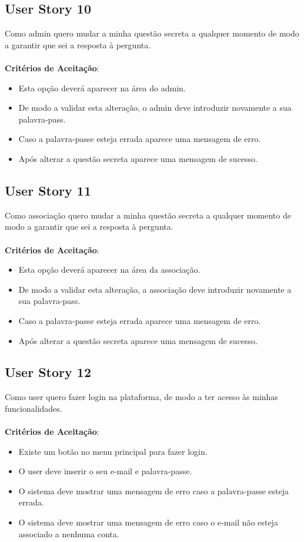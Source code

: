 \documentclass[a4paper,11pt]{article}
\begin{document}
\subsection{User Story 10}
Como admin quero mudar a minha questão secreta a qualquer momento de modo a garantir que sei a resposta à pergunta.\\\\
\textbf{Critérios de Aceitação}:
\begin{itemize}
  \item Esta opção deverá aparecer na área do admin.
  \item De modo a validar esta alteração, o admin deve introduzir novamente a sua palavra-pass.
  \item Caso a palavra-passe esteja errada aparece uma mensagem de erro.
  \item Após alterar a questão secreta aparece uma mensagem de sucesso.
\end{itemize}

\subsection{User Story 11}
Como associação quero mudar a minha questão secreta a qualquer momento de modo a garantir que sei a resposta à pergunta.\\\\
\textbf{Critérios de Aceitação}:
\begin{itemize}
  \item Esta opção deverá aparecer na área da associação.
  \item De modo a validar esta alteração, a associação deve introduzir novamente a sua palavra-pass.
  \item Caso a palavra-passe esteja errada aparece uma mensagem de erro.
  \item Após alterar a questão secreta aparece uma mensagem de sucesso.
\end{itemize}

\subsection{User Story 12}
Como user quero fazer login na plataforma, de modo a ter acesso às minhas funcionalidades.\\\\
\textbf{Critérios de Aceitação}:
\begin{itemize}
  \item Existe um botão no menu principal para fazer login.
  \item O user deve inserir o seu e-mail e palavra-passe.
  \item O sistema deve mostrar uma mensagem de erro caso a palavra-passe esteja errada.
  \item O sistema deve mostrar uma mensagem de erro caso o e-mail não esteja associado a nenhuma conta.
\end{itemize}
\end{document}
